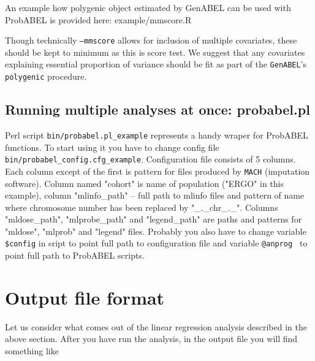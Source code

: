 \documentclass[12pt,a4paper]{article}
\begin{document}
An example how polygenic object estimated by GenABEL can be used with ProbABEL
is provided here: example/mmscore.R

Though technically \texttt{--mmscore} allows for inclusion of multiple 
covariates, these should be kept to minimum as this is score test. We suggest 
that any covariates explaining essential proportion of variance should be 
fit as part of the \texttt{GenABEL}'s \texttt{polygenic} procedure.


\subsection{Running multiple analyses at once: probabel.pl}

Perl script \texttt{bin/probabel.pl\_example} represents a handy wraper for ProbABEL functions. 
To start using it you have to change config file \\
\texttt{bin/probabel\_config.cfg\_example}.
Configuration file consists of 5 columns. Each column except of the first is pattern for 
files produced by \texttt{MACH} (imputation software). 
Column named "cohort" is name of population ("ERGO" in this example), column "mlinfo\_path" -- 
full path to mlinfo files and pattern of name where chromosome number has been 
replaced by "\_.\_chr\_.\_". Columns "mldose\_path", "mlprobe\_path" and "legend\_path" 
are paths and patterns for "mldose", "mlprob" and "legend" files.
Probably you also have to change variable \texttt{\$config} in sript to point full path to 
configuration file and variable \texttt{@anprog } to point full path to ProbABEL scripts.


\section{Output file format}

Let us consider what comes out of the linear regression analysis 
described in the above section. After you have run the analysis, in 
the output file you will find something like

\begin{small}

\end{small}
\end{document}
